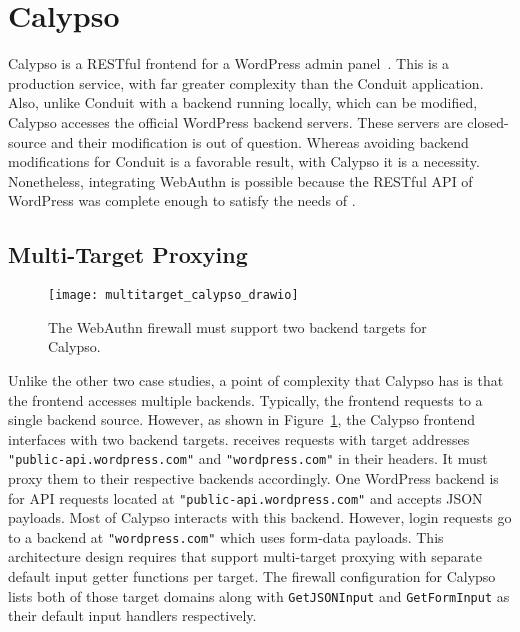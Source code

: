 
\section{Calypso}

Calypso is a RESTful frontend for a WordPress admin panel~\cite{calypso}. This is a production service, with far greater complexity than the Conduit application. Also, unlike Conduit with a backend running locally, which can be modified, Calypso accesses the official WordPress backend servers. These servers are closed-source and their modification is out of question. Whereas avoiding backend modifications for Conduit is a favorable result, with Calypso it is a necessity. Nonetheless, integrating WebAuthn is possible because the RESTful API of WordPress was complete enough to satisfy the needs of \sys{}.

\subsection{Multi-Target Proxying}

\begin{figure}[h]
  \centering
  \texttt{[image: multitarget\_calypso\_drawio]}
  \caption{The WebAuthn firewall must support two backend targets for Calypso.}
  \label{Fig:MultiTargetCalypso}
\end{figure}


Unlike the other two case studies, a point of complexity that Calypso has is that the frontend accesses multiple backends. Typically, the frontend requests to a single backend source. However, as shown in Figure~\ref{Fig:MultiTargetCalypso}, the Calypso frontend interfaces with two backend targets. \sys{} receives requests with target addresses \lstinline{"public-api.wordpress.com"} and \lstinline{"wordpress.com"} in their headers. It must proxy them to their respective backends accordingly. One WordPress backend is for API requests located at \lstinline{"public-api.wordpress.com"} and accepts JSON payloads. Most of Calypso interacts with this backend. However, login requests go to a backend at \lstinline{"wordpress.com"} which uses form-data payloads. This architecture design requires that \sys{} support multi-target proxying with separate default input getter functions per target. The firewall configuration for Calypso lists both of those target domains along with \lstinline{GetJSONInput} and \lstinline{GetFormInput} as their default input handlers respectively. 

